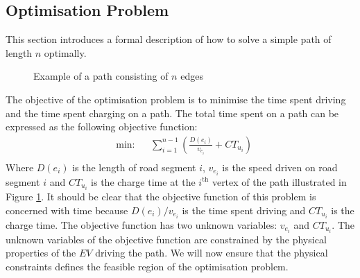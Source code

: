 \subsection{Optimisation Problem}\label{sec:optiprob}
This section introduces a formal description of how to solve a simple path of length $n$ optimally.

\begin{figure}[!htb]
\centering
    \caption{Example of a path consisting of $n$ edges} \label{fig:pathexample}
\end{figure}

The objective of the optimisation problem is to minimise the time spent driving and the time spent charging on a path. The total time spent on a path can be expressed as the following objective function:
\begin{equation*}
\begin{aligned} &
{\text{min:}}
& & \sum_{i=1}^{n-1} \left(\frac{D(e_i)}{v_{e_i}} + CT_{u_i} \right)\\
\end{aligned}
\end{equation*}
Where $D(e_i)$ is the length of road segment $i$, $v_{e_i}$ is the speed driven on road segment $i$ and $CT_{u_i}$ is the charge time at the $i^{\text{th}}$ vertex of the path illustrated in Figure \ref{fig:pathexample}. It should be clear that the objective function of this problem is concerned with time because \( D(e_i)/v_{e_i} \) is the time spent driving and $CT_{u_i}$ is the charge time. The objective function has two unknown variables: $v_{e_i}$ and $CT_{u_i}$. The unknown variables of the objective function are constrained by the physical properties of the $EV$ driving the path. We will now ensure that the physical constraints defines the feasible region of the optimisation problem.

